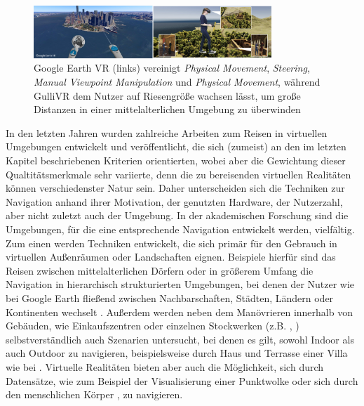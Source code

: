 \begin{figure}[h!]
  \centering
  \includegraphics[width=0.8\textwidth]{images/google_gulli.jpg}
  \caption{Google Earth VR (links) vereinigt \textit{Physical Movement}, \textit{Steering}, \textit{Manual Viewpoint Manipulation} und \textit{Physical Movement}, während GulliVR \cite{Krekhov2018GulliVR} dem Nutzer auf Riesengröße wachsen lässt, um große Distanzen  in einer mittelalterlichen Umgebung zu überwinden}
  \label{fig:todo}
\end{figure}

In den letzten Jahren wurden zahlreiche Arbeiten zum Reisen in virtuellen Umgebungen entwickelt und veröffentlicht, die sich (zumeist) an den im letzten Kapitel beschriebenen Kriterien orientierten, wobei aber die Gewichtung dieser Qualtitätsmerkmale sehr variierte, denn die zu bereisenden virtuellen Realitäten können verschiedenster Natur sein. Daher unterscheiden sich die Techniken zur Navigation anhand ihrer Motivation, der genutzten Hardware, der Nutzerzahl, aber nicht zuletzt auch der Umgebung.
In der akademischen Forschung sind die Umgebungen, für die eine entsprechende Navigation entwickelt werden, vielfältig.
Zum einen werden Techniken entwickelt, die sich primär für den Gebrauch in virtuellen Außenräumen oder Landschaften eignen. Beispiele hierfür sind das Reisen zwischen mittelalterlichen Dörfern \cite{Krekhov2018GulliVR} oder in größerem Umfang die Navigation in hierarchisch strukturierten Umgebungen, bei denen der Nutzer wie bei Google Earth fließend zwischen Nachbarschaften, Städten, Ländern oder Kontinenten wechselt \cite{pierce_representations}.
Außerdem werden neben dem Manövrieren innerhalb von Gebäuden, wie Einkaufszentren oder einzelnen Stockwerken (z.B. \cite{Richardson1999}, \cite{Liang2018EvaluatingEnvironments}) selbstverständlich auch Szenarien untersucht, bei denen es gilt, sowohl Indoor als auch Outdoor zu navigieren, beispielsweise durch Haus und Terrasse einer Villa wie bei \cite{Dallat2018Giant}. 
Virtuelle Realitäten bieten aber auch die Möglichkeit, sich durch Datensätze, wie zum Beispiel der Visualisierung einer Punktwolke oder sich durch den menschlichen Körper \cite{Kopper2006DesignEnvironments}, zu navigieren.

